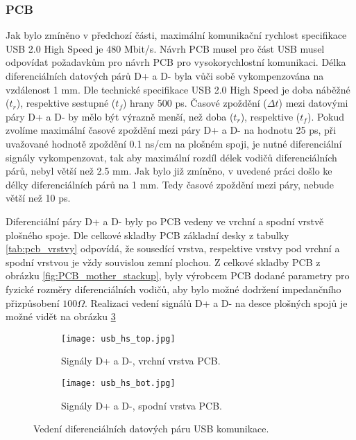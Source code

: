 	\subsubsection{PCB}
	Jak bylo zmíněno v předchozí části, maximální komunikační rychlost specifikace USB 2.0 High Speed je 480 Mbit/s. Návrh PCB musel pro část USB musel odpovídat požadavkům pro návrh PCB pro vysokorychlostní komunikaci. Délka diferenciálních datových párů D+ a D- byla vůči sobě vykompenzována na vzdálenost 1 mm. Dle technické specifikace USB 2.0 High Speed je doba náběžné ($t_r$), respektive sestupné ($t_f$) hrany 500 ps. Časové zpoždění ($\Delta t$) mezi datovými páry D+ a D- by mělo být výrazně menší, než doba ($t_r$), respektive ($t_f$). Pokud zvolíme maximální časové zpoždění mezi páry D+ a D- na hodnotu 25 ps, při uvažované hodnotě zpoždění 0.1 ns/cm na plošném spoji, je nutné diferenciální signály vykompenzovat, tak aby maximální rozdíl délek vodičů diferenciálních párů, nebyl větší než 2.5 mm. Jak bylo již zmíněno, v uvedené práci došlo ke délky diferenciálních párů na 1 mm. Tedy časové zpoždění mezi páry, nebude větší než 10 ps.
	\par Diferenciální páry D+ a D- byly po PCB vedeny ve vrchní a spodní vrstvě plošného spoje. Dle celkové skladby PCB základní desky z tabulky \ref{tab:pcb_vrstvy} odpovídá, že sousedící vrstva, respektive vrstvy pod vrchní a spodní vrstvou je vždy souvislou zemní plochou. Z celkové skladby PCB z obrázku \ref{fig:PCB_mother_stackup}, byly výrobcem PCB dodané parametry pro fyzické rozměry diferenciálních vodičů, aby bylo možné dodržení impedančního přizpůsobení $100 \Omega$. Realizaci vedení signálů D+ a D- na desce plošných spojů je možné vidět na obrázku \ref{fig:usb_layout}
	
	\begin{figure}[h!]
		\begin{subfigure}{0.5\textwidth}
			\centering
			\captionsetup{justification=centering}
			\texttt{[image: usb\_hs\_top.jpg]}
			\caption{Signály D+ a D-, vrchní vrstva PCB.} 
			\label{fig:usb_top}
		\end{subfigure} \hfill
		\begin{subfigure}{0.5\textwidth}
			\centering
			\captionsetup{justification=centering}
			\texttt{[image: usb\_hs\_bot.jpg]}
			\caption{Signály D+ a D-, spodní vrstva PCB.} 
			\label{fig:usb_bot}
		\end{subfigure}
		\caption{Vedení diferenciálních datových páru USB komunikace.}
		\label{fig:usb_layout}
	\end{figure} 


